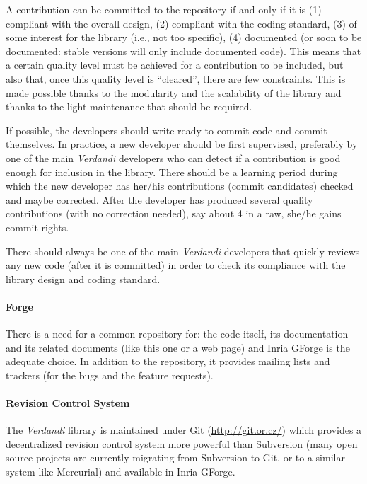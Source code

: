 \documentclass{tufte-book}
\begin{document}
\begin{itemize}
A contribution can be committed to the repository if and only if it is (1)
compliant with the overall design, (2) compliant with the coding standard, (3)
of some interest for the library (i.e., not too specific), (4) documented (or
soon to be documented: stable versions will only include documented code). This
means that a certain quality level must be achieved for a contribution to be
included, but also that, once this quality level is ``cleared'', there are few
constraints. This is made possible thanks to the modularity and the
scalability of the library and thanks to the light maintenance that should be
required.

If possible, the developers should write ready-to-commit code and commit
themselves. In practice, a new developer should be first supervised,
preferably by one of the main \emph{Verdandi} developers who can detect if a contribution is good enough for
inclusion in the library. There should be a learning period during which the
new developer has her/his contributions (commit candidates) checked and maybe
corrected. After the developer has produced several quality contributions
(with no correction needed), say about 4 in a raw, she/he gains commit rights.

There should always be one of the main \emph{Verdandi} developers that quickly reviews
any new code (after it is committed) in order to check its compliance with the
library design and coding standard.


\paragraph{Forge}

There is a need for a common repository for: the code itself, its
documentation and its related documents (like this one or a web page) and
Inria GForge is the adequate choice. In addition to the repository, it
provides mailing lists and trackers (for the bugs and the feature
requests).

\paragraph{Revision Control System}

The \emph{Verdandi} library is maintained under Git (\url{http://git.or.cz/}) which provides
a decentralized revision control system more powerful than Subversion (many open source projects are currently
migrating from Subversion to Git, or to a similar system like Mercurial) and available in Inria GForge.


\end{itemize}
\end{document}
